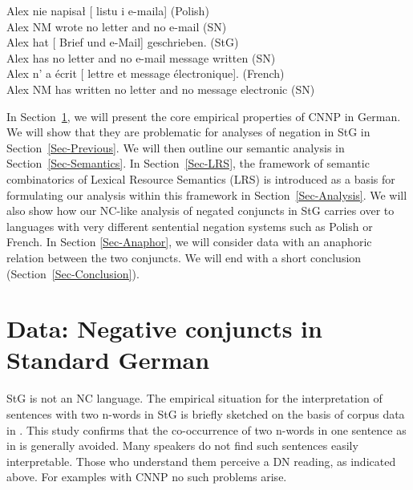 \documentclass[output=paper]{langsci/langscibook}
\begin{document}
\ea \label{ex-conj-pl}
\gll Alex nie napisał [ listu
i  e-maila]
(Polish)\\
Alex NM wrote \hphantom{[}no letter and \hphantom{[}no e-mail (SN)\\
\glt {}
\ex \label{ex-conj-de}
\gll Alex hat [ Brief und  e-Mail] geschrieben. (StG)\\
Alex has \hphantom{[}no letter and \hphantom{[}no {e-mail message} written (SN)\\
\ex \label{ex-conj-fr}
\gll Alex n' a écrit [ lettre et  message électronique]. (French)\\
Alex NM has written \hphantom{[}no letter and \hphantom{[}no message electronic (SN)\\
\z 

In Section~\ref{Sec-Data}, we will present the core empirical properties of CNNP in German. We will show that they are problematic for analyses of negation in StG in Section~\ref{Sec-Previous}. We will then
outline our semantic analysis in Section~\ref{Sec-Semantics}. In Section~\ref{Sec-LRS}, the framework of semantic combinatorics of Lexical Resource Semantics (LRS) is introduced as a basis for formulating our analysis within this framework in Section~\ref{Sec-Analysis}. 
We will also show how our NC-like analysis of negated conjuncts in StG carries over to languages with very different sentential negation systems such as Polish or French.
In Section \ref{Sec-Anaphor}, we will consider data with an anaphoric relation between the two conjuncts.
We will end with a short conclusion (Section~\ref{Sec-Conclusion}).

\section{Data: Negative conjuncts in Standard German}\label{Sec-Data}\largerpage[2]

StG is not an NC language. 
The empirical situation for the interpretation of sentences with two n-words in StG is briefly sketched on the basis of corpus data in \citet[242--245]{Sailer:18}.
This study confirms that the co-occurrence of two n-words in one sentence as in  is generally avoided. %
Many speakers do not find such sentences easily interpretable. 
Those who understand them perceive a DN reading, as indicated above.
For examples with CNNP no such problems arise.
\end{document}
